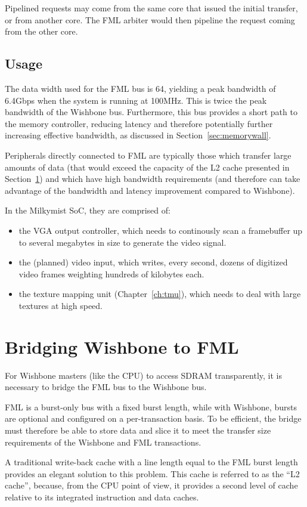 \documentclass[a4paper,11pt]{kthesis}
\begin{document}
Pipelined requests may come from the same core that issued the initial transfer, or from another core. The FML arbiter would then pipeline the request coming from the other core.

\subsection{Usage}
The data width used for the FML bus is 64, yielding a peak bandwidth of 6.4Gbps when the system is running at 100MHz. This is twice the peak bandwidth of the Wishbone bus. Furthermore, this bus provides a short path to the memory controller, reducing latency and therefore potentially further increasing effective bandwidth, as discussed in Section~\ref{sec:memorywall}.

Peripherals directly connected to FML are typically those which transfer large amounts of data (that would exceed the capacity of the L2 cache presented in Section~\ref{sec:fmlbrg}) and which have high bandwidth requirements (and therefore can take advantage of the bandwidth and latency improvement compared to Wishbone).

In the Milkymist SoC, they are comprised of:
\begin{itemize}
\item the VGA output controller, which needs to continously scan a framebuffer up to several megabytes in size to generate the video signal.
\item the (planned) video input, which writes, every second, dozens of digitized video frames weighting hundreds of kilobytes each.
\item the texture mapping unit (Chapter~\ref{ch:tmu}), which needs to deal with large textures at high speed.
\end{itemize}

\section{Bridging Wishbone to FML}
\label{sec:fmlbrg}
For Wishbone masters (like the CPU) to access SDRAM transparently, it is necessary to bridge the FML bus to the Wishbone bus.

FML is a burst-only bus with a fixed burst length, while with Wishbone, bursts are optional and configured on a per-transaction basis. To be efficient, the bridge must therefore be able to store data and slice it to meet the transfer size requirements of the Wishbone and FML transactions.

A traditional write-back cache with a line length equal to the FML burst length provides an elegant solution to this problem. This cache is referred to as the ``L2 cache'', because, from the CPU point of view, it provides a second level of cache relative to its integrated instruction and data caches.
\end{document}
